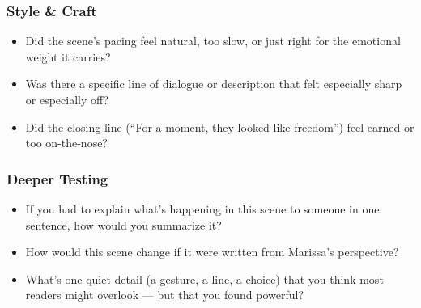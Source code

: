 \subsubsection*{Style \& Craft}

\begin{itemize}
  \item Did the scene’s pacing feel natural, too slow, or just right for the emotional weight it carries?
  \item Was there a specific line of dialogue or description that felt especially sharp or especially off?
  \item Did the closing line (“For a moment, they looked like freedom”) feel earned or too on-the-nose?
\end{itemize}

\subsubsection*{Deeper Testing}

\begin{itemize}
  \item If you had to explain what’s happening in this scene to someone in one sentence, how would you summarize it?
  \item How would this scene change if it were written from Marissa’s perspective?
  \item What’s one quiet detail (a gesture, a line, a choice) that you think most readers might overlook — but that you found powerful?
\end{itemize}

